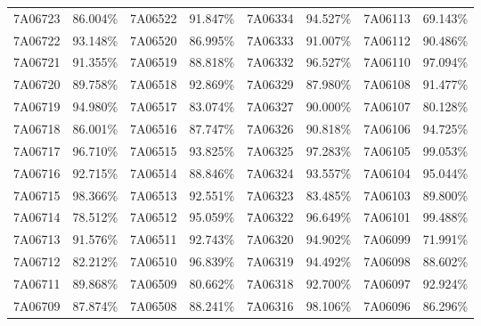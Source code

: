 \documentclass[12pt]{article}%
\begin{document}
\begin{longtable}{|cc|cc|cc|cc|}
7A06723              & 86.004\% & 7A06522              & 91.847\% & 7A06334              & 94.527\% & \multicolumn{1}{l}{7A06113             } & 69.143\% \\
7A06722              & 93.148\% & 7A06520              & 86.995\% & 7A06333              & 91.007\% & \multicolumn{1}{l}{7A06112             } & 90.486\% \\
7A06721              & 91.355\% & 7A06519              & 88.818\% & 7A06332              & 96.527\% & \multicolumn{1}{l}{7A06110             } & 97.094\% \\
7A06720              & 89.758\% & 7A06518              & 92.869\% & 7A06329              & 87.980\% & \multicolumn{1}{l}{7A06108             } & 91.477\% \\
7A06719              & 94.980\% & 7A06517              & 83.074\% & 7A06327              & 90.000\% & \multicolumn{1}{l}{7A06107             } & 80.128\% \\
7A06718              & 86.001\% & 7A06516              & 87.747\% & 7A06326              & 90.818\% & \multicolumn{1}{l}{7A06106             } & 94.725\% \\
7A06717              & 96.710\% & 7A06515              & 93.825\% & 7A06325              & 97.283\% & \multicolumn{1}{l}{7A06105             } & 99.053\% \\
7A06716              & 92.715\% & 7A06514              & 88.846\% & 7A06324              & 93.557\% & \multicolumn{1}{l}{7A06104             } & 95.044\% \\
7A06715              & 98.366\% & 7A06513              & 92.551\% & 7A06323              & 83.485\% & \multicolumn{1}{l}{7A06103             } & 89.800\% \\
7A06714              & 78.512\% & 7A06512              & 95.059\% & 7A06322              & 96.649\% & \multicolumn{1}{l}{7A06101             } & 99.488\% \\
7A06713              & 91.576\% & 7A06511              & 92.743\% & 7A06320              & 94.902\% & \multicolumn{1}{l}{7A06099             } & 71.991\% \\
7A06712              & 82.212\% & 7A06510              & 96.839\% & 7A06319              & 94.492\% & \multicolumn{1}{l}{7A06098             } & 88.602\% \\
7A06711              & 89.868\% & 7A06509              & 80.662\% & 7A06318              & 92.700\% & \multicolumn{1}{l}{7A06097             } & 92.924\% \\
7A06709              & 87.874\% & 7A06508              & 88.241\% & 7A06316              & 98.106\% & \multicolumn{1}{l}{7A06096             } & 86.296\% \\

\end{longtable}
\end{document}

